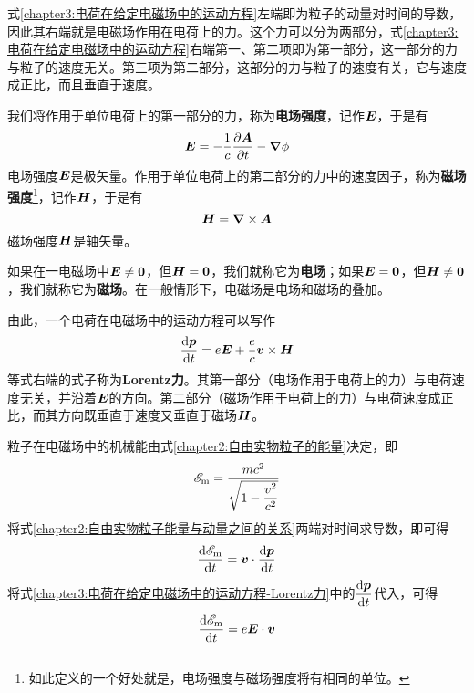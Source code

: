 式\eqref{chapter3:电荷在给定电磁场中的运动方程}左端即为粒子的动量对时间的导数，因此其右端就是电磁场作用在电荷上的力。这个力可以分为两部分，式\eqref{chapter3:电荷在给定电磁场中的运动方程}右端第一、第二项即为第一部分，这一部分的力与粒子的速度无关。第三项为第二部分，这部分的力与粒子的速度有关，它与速度成正比，而且垂直于速度。

我们将作用于单位电荷上的第一部分的力，称为{\bf 电场强度}，记作$\boldsymbol{E}$，于是有
\begin{equation}
	\boldsymbol{E} = - \frac1c\frac{\partial \boldsymbol{A}}{\partial t} - \boldsymbol{\nabla} \phi
	\label{chapter3:电场强度的定义}
\end{equation}
电场强度$\boldsymbol{E}$是极矢量。作用于单位电荷上的第二部分的力中的速度因子，称为{\bf 磁场强度}\footnote{如此定义的一个好处就是，电场强度与磁场强度将有相同的单位。}，记作$\boldsymbol{H}$，于是有
\begin{equation}
	\boldsymbol{H} = \boldsymbol{\nabla} \times \boldsymbol{A}
	\label{chapter3:磁场强度的定义}
\end{equation}
磁场强度$\boldsymbol{H}$是轴矢量。

如果在一电磁场中$\boldsymbol{E}\neq \boldsymbol{0}$，但$\boldsymbol{H}=\boldsymbol{0}$，我们就称它为{\bf 电场}；如果$\boldsymbol{E}= \boldsymbol{0}$，但$\boldsymbol{H}\neq \boldsymbol{0}$，我们就称它为{\bf 磁场}。在一般情形下，电磁场是电场和磁场的叠加。

由此，一个电荷在电磁场中的运动方程可以写作
\begin{equation}
	\frac{\mathrm{d} \boldsymbol{p}}{\mathrm{d} t} = e\boldsymbol{E}+\dfrac{e}{c}\boldsymbol{v}\times \boldsymbol{H}
	\label{chapter3:电荷在给定电磁场中的运动方程-Lorentz力}
\end{equation}
等式右端的式子称为{\bf Lorentz力}。其第一部分（电场作用于电荷上的力）与电荷速度无关，并沿着$\boldsymbol{E}$的方向。第二部分（磁场作用于电荷上的力）与电荷速度成正比，而其方向既垂直于速度又垂直于磁场$\boldsymbol{H}$。

粒子在电磁场中的机械能由式\eqref{chapter2:自由实物粒子的能量}决定，即
\begin{equation*}
	\mathscr{E}_{\text{m}} = \frac{mc^2}{\sqrt{1-\dfrac{v^2}{c^2}}}
\end{equation*}
将式\eqref{chapter2:自由实物粒子能量与动量之间的关系}两端对时间求导数，即可得
\begin{equation*}
	\frac{\mathrm{d} \mathscr{E}_{\text{m}}}{\mathrm{d} t} = \boldsymbol{v}\cdot \frac{\mathrm{d} \boldsymbol{p}}{\mathrm{d} t}
\end{equation*}
将式\eqref{chapter3:电荷在给定电磁场中的运动方程-Lorentz力}中的$\dfrac{\mathrm{d} \boldsymbol{p}}{\mathrm{d} t}$代入，可得
\begin{equation}
	\frac{\mathrm{d} \mathscr{E}_{\text{m}}}{\mathrm{d} t} = e\boldsymbol{E}\cdot \boldsymbol{v}
	\label{chapter3:电磁场中电荷能量的变化}
\end{equation}

